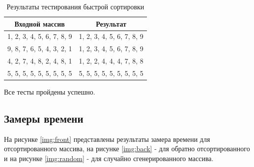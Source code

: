 \documentclass[a4paper,12pt]{article}
\begin{document}
\begin{table}[H]
    \centering
    \caption{Результаты тестирования быстрой сортировки}
    \label{table:qsort}
    \begin{tabular}{|c|c|}
        \hline
        Входной массив & Результат \\
        \hline
        1, 2, 3, 4, 5, 6, 7, 8, 9 & 1, 2, 3, 4, 5, 6, 7, 8, 9 \\
        \hline
        9, 8, 7, 6, 5, 4, 3, 2, 1 & 1, 2, 3, 4, 5, 6, 7, 8, 9 \\
        \hline
        4, 2, 7, 4, 8, 2, 4, 8, 1 & 1, 2, 2, 4, 4, 4, 7, 8, 8 \\
        \hline
        5, 5, 5, 5, 5, 5, 5, 5, 5 & 5, 5, 5, 5, 5, 5, 5, 5, 5 \\
        \hline
    \end{tabular}
\end{table}

Все тесты пройдены успешно.

\subsection{Замеры времени}

На рисунке \ref{img:front} представлены результаты замера времени для отсортированного
массива, на рисунке \ref{img:back} - для обратно отсортированного и на рисунке
\ref{img:random} - для случайно сгенерированного массива.
\end{document}
